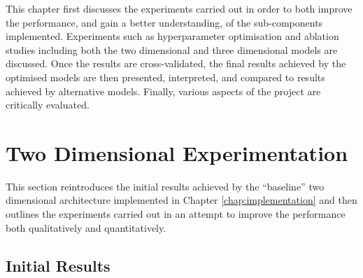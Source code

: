 This chapter first discusses the experiments carried out in order to both improve the performance, and gain a better understanding, of the sub-components implemented. Experiments such as hyperparameter optimisation and ablation studies including both the two dimensional and three dimensional models are discussed. Once the results are cross-validated, the final results achieved by the optimised models are then presented, interpreted, and compared to results achieved by alternative models. Finally, various aspects of the project are critically evaluated.

\section{Two Dimensional Experimentation}

This section reintroduces the initial results achieved by the ``baseline'' two dimensional architecture implemented in Chapter \ref{chap:implementation} and then outlines the experiments carried out in an attempt to improve the performance both qualitatively and quantitatively.

\subsection{Initial Results}

